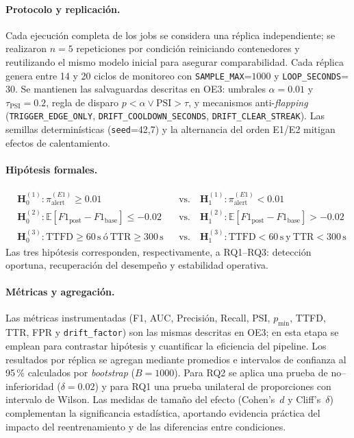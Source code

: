 \paragraph{Protocolo y replicación.}
Cada ejecución completa de los jobs se considera una réplica independiente; se realizaron $n=5$ repeticiones por condición reiniciando contenedores y reutilizando el mismo modelo inicial para asegurar comparabilidad. Cada réplica genera entre 14 y 20 ciclos de monitoreo con \texttt{SAMPLE\_MAX}=$1000$ y \texttt{LOOP\_SECONDS}=$30$. Se mantienen las salvaguardas descritas en OE3: umbrales $\alpha=0.01$ y $\tau_{\text{PSI}}=0.2$, regla de disparo $p<\alpha \lor \text{PSI}>\tau$, y mecanismos anti-\textit{flapping} (\texttt{TRIGGER\_EDGE\_ONLY}, \texttt{DRIFT\_COOLDOWN\_SECONDS}, \texttt{DRIFT\_CLEAR\_STREAK}). Las semillas determinísticas (\texttt{seed}=42,7) y la alternancia del orden E1/E2 mitigan efectos de calentamiento.

\paragraph{Hipótesis formales.}
\[
\begin{aligned}
&\textbf{H}_{0}^{(1)}: \pi_{\mathrm{alert}}^{(E1)} \ge 0.01 
&&\text{vs.}\quad \textbf{H}_{1}^{(1)}: \pi_{\mathrm{alert}}^{(E1)} < 0.01 \\[3pt]
&\textbf{H}_{0}^{(2)}: \mathbb{E}[F1_{\mathrm{post}} - F1_{\mathrm{base}}] \le -0.02 
&&\text{vs.}\quad \textbf{H}_{1}^{(2)}: \mathbb{E}[F1_{\mathrm{post}} - F1_{\mathrm{base}}] > -0.02 \\[3pt]
&\textbf{H}_{0}^{(3)}: \mathrm{TTFD} \ge 60\,\mathrm{s} \ \text{ó}\  \mathrm{TTR} \ge 300\,\mathrm{s} 
&&\text{vs.}\quad \textbf{H}_{1}^{(3)}: \mathrm{TTFD} < 60\,\mathrm{s} \ \text{y}\  \mathrm{TTR} < 300\,\mathrm{s}
\end{aligned}
\]
Las tres hipótesis corresponden, respectivamente, a RQ1–RQ3:
detección oportuna, recuperación del desempeño y estabilidad operativa.

\paragraph{Métricas y agregación.}
Las métricas instrumentadas (F1, AUC, Precisión, Recall, PSI, $p_{\min}$, TTFD, TTR, FPR y \texttt{drift\_factor}) son las mismas descritas en OE3; en esta etapa se emplean para contrastar hipótesis y cuantificar la eficiencia del pipeline. Los resultados por réplica se agregan mediante promedios e intervalos de confianza al 95\,\% calculados por \textit{bootstrap} ($B=1000$).  
Para RQ2 se aplica una prueba de no–inferioridad ($\delta=0.02$) y para RQ1 una prueba unilateral de proporciones con intervalo de Wilson.  
Las medidas de tamaño del efecto (Cohen’s~$d$ y Cliff’s~$\delta$) complementan la significancia estadística, aportando evidencia práctica del impacto del reentrenamiento y de las diferencias entre condiciones.

